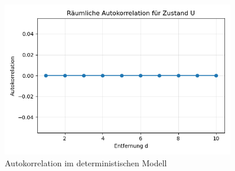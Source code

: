 \documentclass{SeminarV2}
\begin{document}
\begin{figure}
  \centering
  \includegraphics[width=0.9\textwidth]{images/Autokor_det.png}
  \caption{Autokorrelation im deterministischen Modell}
  \label{fig:cpg_states_auto_det}
\end{figure}


\begin{footnotesize}
\newpage


\end{footnotesize}
\end{document}
